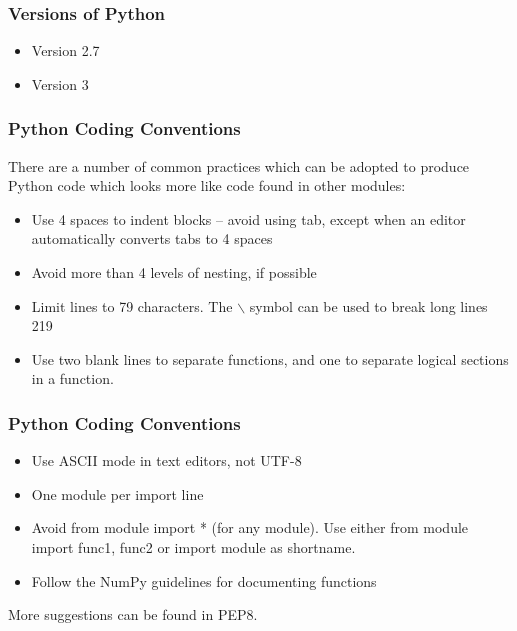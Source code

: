 \documentclass[MASTER.tex]{subfiles}
\begin{document}
 
	
\begin{frame}
	\frametitle{Versions of Python}
	
	\begin{itemize}
		\item Version 2.7
		\item Version 3
	\end{itemize}
	
\end{frame}
\begin{frame}
\frametitle{Python Coding Conventions}
There are a number of common practices which can be adopted to produce Python code which looks
more like code found in other modules:
\begin{itemize}
	\item Use 4 spaces to indent blocks – avoid using tab, except when an editor automatically converts tabs
	to 4 spaces
	\item Avoid more than 4 levels of nesting, if possible
	\item Limit lines to 79 characters. The $\backslash$ symbol can be used to break long lines
	219
	\item Use two blank lines to separate functions, and one to separate logical sections in a function.
\end{itemize}
	
\end{frame}
\begin{frame}
\frametitle{Python Coding Conventions}
\begin{itemize}	
	\item Use ASCII mode in text editors, not UTF-8
	\item One module per import line
	\item Avoid from module import * (for any module). Use either from module import func1, func2 or
	import module as shortname.
	\item Follow the NumPy guidelines for documenting functions
\end{itemize}

More suggestions can be found in PEP8.
\end{frame}
\end{document}
